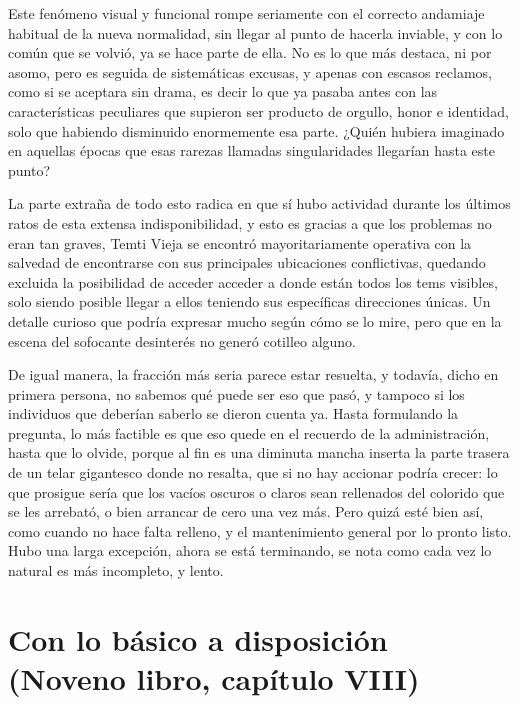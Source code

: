 \documentclass[
  spanish,
]{book}
\begin{document}
Este fenómeno visual y funcional rompe seriamente con el correcto andamiaje habitual de la nueva normalidad, sin llegar al punto de hacerla inviable, y con lo común que se volvió, ya se hace parte de ella. No es lo que más destaca, ni por asomo, pero es seguida de sistemáticas excusas, y apenas con escasos reclamos, como si se aceptara sin drama, es decir lo que ya pasaba antes con las características peculiares que supieron ser producto de orgullo, honor e identidad, solo que habiendo disminuido enormemente esa parte. ¿Quién hubiera imaginado en aquellas épocas que esas rarezas llamadas singularidades llegarían hasta este punto?

La parte extraña de todo esto radica en que sí hubo actividad durante los últimos ratos de esta extensa indisponibilidad, y esto es gracias a que los problemas no eran tan graves, Temti Vieja se encontró mayoritariamente operativa con la salvedad de encontrarse con sus principales ubicaciones conflictivas, quedando excluida la posibilidad de acceder acceder a donde están todos los tems visibles, solo siendo posible llegar a ellos teniendo sus específicas direcciones únicas. Un detalle curioso que podría expresar mucho según cómo se lo mire, pero que en la escena del sofocante desinterés no generó cotilleo alguno.

De igual manera, la fracción más seria parece estar resuelta, y todavía, dicho en primera persona, no sabemos qué puede ser eso que pasó, y tampoco si los individuos que deberían saberlo se dieron cuenta ya. Hasta formulando la pregunta, lo más factible es que eso quede en el recuerdo de la administración, hasta que lo olvide, porque al fin es una diminuta mancha inserta la parte trasera de un telar gigantesco donde no resalta, que si no hay accionar podría crecer: lo que prosigue sería que los vacíos oscuros o claros sean rellenados del colorido que se les arrebató, o bien arrancar de cero una vez más. Pero quizá esté bien así, como cuando no hace falta relleno, y el mantenimiento general por lo pronto listo. Hubo una larga excepción, ahora se está terminando, se nota como cada vez lo natural es más incompleto, y lento.

\hypertarget{con-lo-buxe1sico-a-disposiciuxf3n-noveno-libro-capuxedtulo-viii}{%
\section{Con lo básico a disposición (Noveno libro, capítulo VIII)}\label{con-lo-buxe1sico-a-disposiciuxf3n-noveno-libro-capuxedtulo-viii}}
\end{document}
